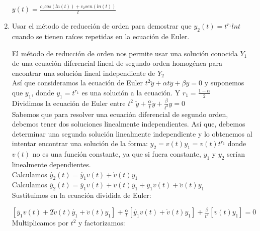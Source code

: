 \documentclass{article}
\begin{document}
\begin{enumerate}
{            $y(t) = \frac{c_1cos(ln(t)) + c_2 sen(ln(t))}{t} $\\
            
            
        }
        \item {
            Usar el método de reducción de orden para demostrar que 
            $y_2(t) = t ^ {r_1} ln t$ cuando se tienen raíces repetidas en la 
            ecuación de Euler. 

            \color{azul}
            El método de reducción de orden nos permite usar una solución conocida $Y_1$ de una ecuación diferencial lineal de segundo orden homogénea para encontrar una solución lineal independiente de $Y_2$\\
            
            Así que consideramos la ecuación de Euler $t^2\ddot{y} + \alpha t \dot{y} + \beta y = 0$ y suponemos que $y_1$, donde $y_1 = t^{r_1}$ es una solución a la ecuación. Y $r_1 = \frac{1 - \alpha}{2}$ \\
            
            Dividimos la ecuación de Euler entre $t^2$
            $\ddot{y} + \frac{\alpha}{t}\dot{y} + \frac{\beta}{t^2}y = 0$\\
            
            Sabemos que para resolver una ecuación diferencial de segundo orden, debemos tener dos soluciones linealmente independientes. Así que, debemos determinar una segunda solución linealmente independiente y lo obtenemos al intentar encontrar una solución de la forma: $y_2 = v(t) y_1 = v(t) t^{r_1}$ donde $v(t)$ no es una función constante, ya que si fuera constante, $y_1$ y $y_2$ serían linealmente dependientes.\\
                        
            Calculamos $\dot{y_2}(t) = \dot{y_1} v(t) + \dot{v}(t)y_1  $\\
            Calculamos $\ddot{y_2}(t) = \ddot{y_1} v(t) + \dot{v}(t)\dot{y_1} + \dot{y_1}\dot{v}(t) + \ddot{v}(t)y_1  $\\
            
            Sustituimos en la ecuación dividida de Euler:
            
            $ [\ddot{y_1} v(t) + 2\dot{v}(t)\dot{y_1} + \ddot{v}(t)y_1] + \frac{\alpha}{t} [\dot{y_1} v(t) + \dot{v}(t)y_1] + \frac{\beta}{t^2} [v(t) y_1] = 0$\\
            
            Multiplicamos por $t^2$ y factorizamos:
            
}
\end{enumerate}
\end{document}
